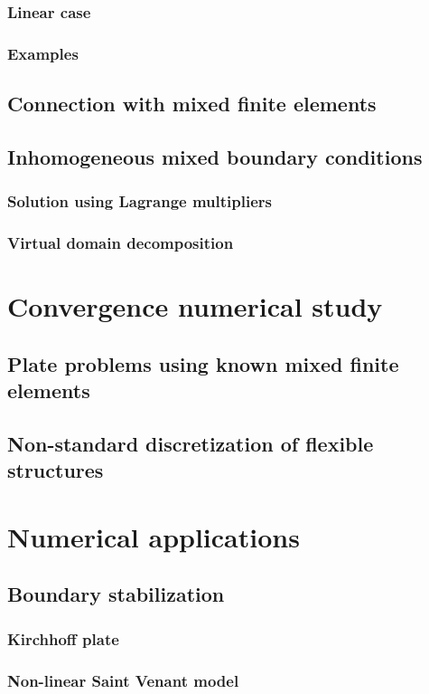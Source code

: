 \documentclass[a4paper,11pt]{book}
\begin{document}
\subsection{Linear case}
\subsection{Examples}

\section{Connection with mixed finite elements}
\section{Inhomogeneous mixed boundary conditions}
\subsection{Solution using Lagrange multipliers}
\subsection{Virtual domain decomposition}

\chapter{Convergence numerical study}
\section{Plate problems using known mixed finite elements}
\section{Non-standard discretization of flexible structures}

\chapter{Numerical applications}

\section{Boundary stabilization}
\subsection{Kirchhoff plate}
\subsection{Non-linear Saint Venant model}
\end{document}
